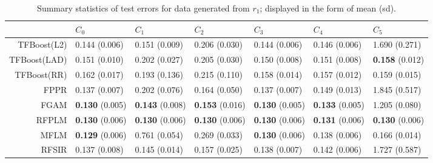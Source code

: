 \renewcommand{\arraystretch}{1.5}
\addtolength{\tabcolsep}{-3pt}    
\begin{table}[H]
\centering
\footnotesize
\begin{tabular}{rllllll}
  \hline
 & $C_0$ & $C_1$ & $C_2$ & $C_3$ & $C_4$ & $C_5$ \\ 
  \hline
TFBoost(L2) & 0.144 (0.006) & 0.151 (0.009) & 0.206 (0.030) & 0.144 (0.006) & 0.146 (0.006) & 1.690 (0.271) \\ 
  TFBoost(LAD) & 0.151 (0.010) & 0.202 (0.027) & 0.205 (0.030) & 0.150 (0.008) & 0.151 (0.008) & \textbf{0.158} (0.012) \\ 
  TFBoost(RR) & 0.162 (0.017) & 0.193 (0.136) & 0.215 (0.110) & 0.158 (0.014) & 0.157 (0.012) & 0.159 (0.015) \\ 
  FPPR & 0.137 (0.007) & 0.202 (0.076) & 0.164 (0.050) & 0.137 (0.007) & 0.149 (0.013) & 1.845 (0.517) \\ 
  FGAM & \textbf{0.130} (0.005) & \textbf{0.143} (0.008) & \textbf{0.153} (0.016) & \textbf{0.130} (0.005) & \textbf{0.133} (0.005) & 1.205 (0.080) \\ 
  RFPLM & \textbf{0.130} (0.006) & \textbf{0.130} (0.006) & \textbf{0.130} (0.006) & \textbf{0.130} (0.006) & \textbf{0.131} (0.006) & \textbf{0.130} (0.006) \\ 
  MFLM & \textbf{0.129} (0.006) & 0.761 (0.054) & 0.269 (0.033) & \textbf{0.130} (0.006) & 0.138 (0.006) & 0.166 (0.014) \\ 
  RFSIR & 0.137 (0.008) & 0.145 (0.014) & 0.157 (0.025) & 0.138 (0.007) & 0.142 (0.006) & 1.727 (0.587) \\ 
   \hline
\end{tabular}
\caption{Summary statistics of test errors for data generated from $r_1$; displayed in the form of mean (sd).} 
\end{table}
